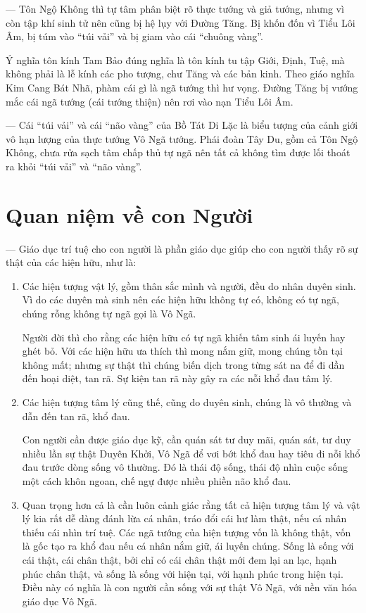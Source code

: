--- Tôn Ngộ Không thì tự tâm phân biệt rõ thực tướng và giả tướng, nhưng vì còn tập khí sinh tử nên cũng bị hệ lụy với Đường Tăng. Bị khốn đốn vì Tiểu Lôi Âm, bị túm vào ``túi vải'' và bị giam vào cái ``chuông vàng''.

Ý nghĩa tôn kính Tam Bảo đúng nghĩa là tôn kính tu tập Giới, Định, Tuệ, mà không phải là lễ kính các pho tượng, chư Tăng và các bản kinh. Theo giáo nghĩa Kim Cang Bát Nhã, phàm cái gì là ngã tướng thì hư vọng. Đường Tăng bị vướng mắc cái ngã tướng (cái tướng thiện) nên rơi vào nạn Tiểu Lôi Âm.

--- Cái ``túi vải'' và cái ``não vàng'' của Bồ Tát Di Lặc là biểu tượng của cảnh giới vô hạn lượng của thực tướng Vô Ngã tướng. Phái đoàn Tây Du, gồm cả Tôn Ngộ Không, chưa rửa sạch tâm chấp thủ tự ngã nên tất cả không tìm được lối thoát ra khỏi ``túi vải'' và ``não vàng''.

\section{Quan niệm về con Người} %
\label{sec:65_66_con_nguoi}

--- Giáo dục trí tuệ cho con người là phần giáo dục giúp cho con người thấy rõ sự thật của các hiện hữu, như là:

\begin{enumerate}[label=\itshape\alph*\upshape/]
    \item Các hiện tượng vật lý, gồm thân sắc mình và người, đều do nhân duyên sinh. Vì do các duyên mà sinh nên các hiện hữu không tự có, không có tự ngã, chúng rỗng không tự ngã gọi là Vô Ngã.

    Người đời thì cho rằng các hiện hữu có tự ngã khiến tâm sinh ái luyến hay ghét bỏ. Với các hiện hữu ưa thích thì mong nắm giữ, mong chúng tồn tại không mất; nhưng sự thật thì chúng biến dịch trong từng sát na để đi dần đến hoại diệt, tan rã. Sự kiện tan rã này gây ra các nỗi khổ đau tâm lý.

    \item Các hiện tượng tâm lý cũng thế, cũng do duyên sinh, chúng là vô thường và dẫn đến tan rã, khổ đau.

    Con người cần được giáo dục kỹ, cần quán sát tư duy mãi, quán sát, tư duy nhiều lần sự thật Duyên Khởi, Vô Ngã để vơi bớt khổ đau hay tiêu đi nỗi khổ đau trước dòng sống vô thường. Đó là thái độ sống, thái độ nhìn cuộc sống một cách khôn ngoan, chế ngự được nhiều phiền não khổ đau.

    \item Quan trọng hơn cả là cần luôn cảnh giác rằng tất cả hiện tượng tâm lý và vật lý kia rất dễ dàng đánh lừa cá nhân, tráo đổi cái hư làm thật, nếu cá nhân thiếu cái nhìn trí tuệ. Các ngã tướng của hiện tượng vốn là không thật, vốn là gốc tạo ra khổ đau nếu cá nhân nắm giữ, ái luyến chúng. Sống là sống với cái thật, cái chân thật, bởi chỉ có cái chân thật mới đem lại an lạc, hạnh phúc chân thật, và sống là sống với hiện tại, với hạnh phúc trong hiện tại. Điều này có nghĩa là con người cần sống với sự thật Vô Ngã, với nền văn hóa giáo dục Vô Ngã.
\end{enumerate}

